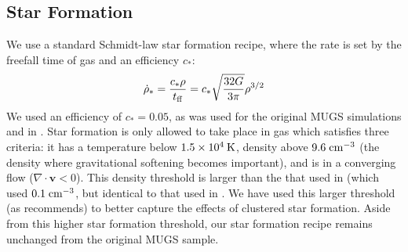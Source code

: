 \subsection{Star Formation}
We use a standard Schmidt-law star formation recipe, where the rate is set by
the freefall time of gas and an efficiency $c_*$: \begin{equation} \dot \rho_* =
\frac{c_*\rho}{t_{\rm ff}} = c_*\sqrt{\frac{32G}{\rm 3\pi}}\rho^{3/2} \end{equation} We
used an efficiency of $c_*=0.05$, as was used for the original MUGS simulations
\citep{Stinson2010} and in \citet{Keller2015}.  Star formation is only allowed
to take place in gas which satisfies three criteria: it has a temperature below
$1.5\times10^4\>{\rm K}$, density above $9.6\;\rm{cm^{-3}}$ (the density where
gravitational softening becomes important), and is in a converging flow
($\nabla\cdot \boldsymbol{v} < 0$).  This density threshold is larger than the that used
in \citet{Stinson2010} (which used $0.1\;\rm{cm^{-3}}$, but identical to that
used in \citet{Stinson2013}.  We have used this larger threshold (as
\citealt{Governato2010} recommends) to better capture the effects of clustered
star formation.  Aside from this higher star formation threshold, our star
formation recipe remains unchanged from the original MUGS sample.

